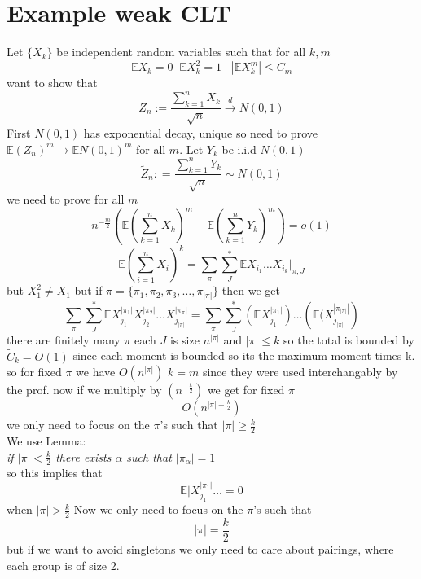 \documentclass[11pt]{article}
\begin{document}
\section{Example weak CLT}
Let $\{X_k\}$ be independent random variables such that for all  $k, m$
\[
    \mathbb{E} X_{k} = 0 \;\; \mathbb{E} X_k^2 = 1 \;\;\; | \mathbb{E}X_k^{m}| \le C_m
\] 
want to show that
\[
    Z_n := \frac{\sum_{k=1}^{n}X_k}{\sqrt{n}} \stackrel{d}{\rightarrow} N(0,1)
\] 
First $N(0,1)$ has exponential decay, unique so need to prove  $ \mathbb{E}(Z_n)^{m} \rightarrow \mathbb{E}N(0,1)^{m}$ for all $m$.
Let $Y_k$ be i.i.d $N(0,1)$
 \[
\tilde Z_n : = \frac{\sum_{k=1}^{n}Y_k}{\sqrt{n}} \sim N(0,1)
\] 
we need to prove for all $m$
 \[
n^{-\frac{m}{2}}\left(\mathbb{E}(\sum_{k=1}^{n}X_k)^{m} - \mathbb{E}(\sum_{k=1}^{n}Y_k)^{m}\right) = o(1)
\] 
\[
    \mathbb{E}\left( \sum_{i=1}^{n}X_i\right)^{k} = \sum_{\pi }^{} \sum_{J}^{*} \mathbb{E} X_{i_1}\dots X_{i_k}|_{\pi,J}
\] 
but $X_1^2 \ne X_1$
but if $\pi = \{\pi_1,\pi_2,\pi_3,\dots,\pi_{|\pi|}\}$ then we get
\[
    \sum_{\pi }^{ } \sum_{J}^{*} \mathbb{E} X_{j_1}^{ |\pi_1|} X_{j_2}^{|\pi_2|} \dots X_{j_{|\pi|}}^{|\pi_\pi|} = \sum_{\pi }^{} \sum_{ J}^{*} \left( \mathbb{E} X_{j_1}^{|\pi_1|}\right) \dots \left( \mathbb{E}(X_{j_{|\pi|}}^{|\pi_{|\pi|}|} \right)
\] 
there are finitely many $\pi$ each $J $ is size  $n^{|\pi|}$ and $|\pi| \le k$ so the total is bounded by $\tilde C_k = O(1)$ since each moment is bounded so its the maximum moment times k. so for fixed $\pi$ we have $O(n^{|\pi|})$ $k= m$ since they were
used interchangably by the prof. now if we multiply by  $(n^{-\frac{k}{2}})$ we get for fixed $\pi$
\[
O(n^{|\pi| - \frac{k}{2}})
\] 
we only need to focus on the $\pi$'s such that $|\pi| \ge \frac{k}{2}$ \\
We use Lemma:\\
\emph{
    if $|\pi| < \frac{k}{2}$ there exists $\alpha$ such that $|\pi_\alpha| = 1$
}\\
so this implies that 
\[
    \mathbb{E}|X_{j_1}^{|\pi_1|} \dots  = 0
\] 
when $|\pi| > \frac{k}{2}$
 Now we only need to focus on the $\pi$'s such that
\[
|\pi| = \frac{k}{2}
\] 
but if we want to avoid singletons we only need to care about pairings, where each group is of size 2.
\end{document}
